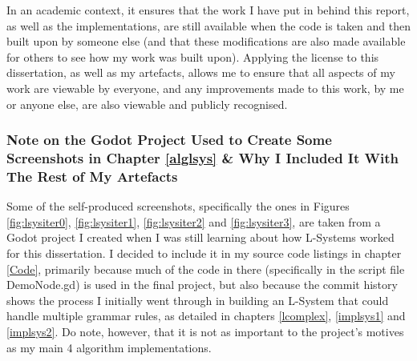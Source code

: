 In an academic context, it ensures that the work I have put in behind this report, as well as the implementations, are still available when the code is taken and then built upon by someone else (and that these modifications are also made available for others to see how my work was built upon). Applying the license to this dissertation, as well as my artefacts, allows me to ensure that all aspects of my work are viewable by everyone, and any improvements made to this work, by me or anyone else, are also viewable and publicly recognised.

\subsubsection{Note on the Godot Project Used to Create Some Screenshots in Chapter \ref{alglsys} \& Why I Included It With The Rest of My Artefacts}

Some of the self-produced screenshots, specifically the ones in Figures \ref{fig:lsysiter0}, \ref{fig:lsysiter1}, \ref{fig:lsysiter2} and \ref{fig:lsysiter3}, are taken from a Godot project I created when I was still learning about how L-Systems worked for this dissertation. I decided to include it in my source code listings in chapter \ref{Code}, primarily because much of the code in there (specifically in the script file DemoNode.gd) is used in the final project, but also because the commit history shows the process I initially went through in building an L-System that could handle multiple grammar rules, as detailed in chapters \ref{lcomplex}, \ref{implsys1} and \ref{implsys2}. Do note, however, that it is not as important to the project's motives as my main 4 algorithm implementations. 